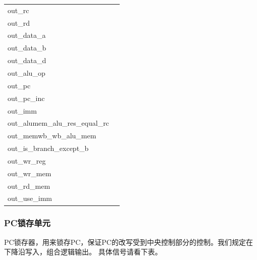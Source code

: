 \begin{center}
\begin{longtable}{p{}p{}}
        out\_rc &  \\
        out\_rd &  \\
        out\_data\_a &  \\
        out\_data\_b &  \\
        out\_data\_d &  \\
        out\_alu\_op &  \\
        out\_pc &  \\
        out\_pc\_inc &  \\
        out\_imm &  \\
        out\_alumem\_alu\_res\_equal\_rc &  \\
        out\_memwb\_wb\_alu\_mem &  \\
        out\_is\_branch\_except\_b &  \\
        out\_wr\_reg &  \\
        out\_wr\_mem &  \\
        out\_rd\_mem &  \\
        out\_use\_imm &  \\
        \bottomrule
    \end{longtable}
\end{center}

\subsubsection{PC锁存单元}
    PC锁存器，用来锁存PC，保证PC的改写受到中央控制部分的控制。我们规定在下降沿写入，组合逻辑输出。
    具体信号请看下表。
